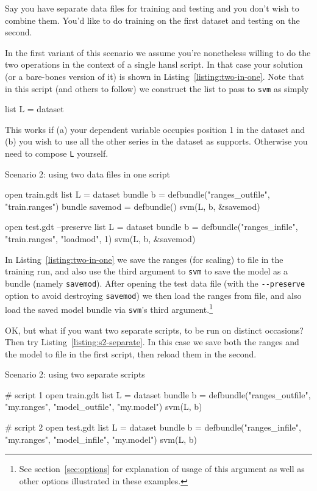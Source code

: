 \documentclass{article}
\begin{document}
Say you have separate data files for training and testing and you
don't wish to combine them. You'd like to do training on the first
dataset and testing on the second.

In the first variant of this scenario we assume you're nonetheless
willing to do the two operations in the context of a single hansl
script. In that case your solution (or a bare-bones version of it) is
shown in Listing~\ref{listing:two-in-one}. Note that in this script
(and others to follow) we construct the list to pass to \texttt{svm}
as simply
\begin{code}
list L = dataset
\end{code}
This works if (a) your dependent variable occupies position 1 in the
dataset and (b) you wish to use all the other series in the dataset as
supports. Otherwise you need to compose \texttt{L} yourself.

\begin{script}[htbp]
  \caption{Scenario 2: using two data files in one script}
  \label{listing:two-in-one}
\begin{scode}
open train.gdt
list L = dataset
bundle b = defbundle("ranges_outfile", "train.ranges")
bundle savemod = defbundle()
svm(L, b, &savemod)

open test.gdt --preserve
list L = dataset
bundle b = defbundle("ranges_infile", "train.ranges", "loadmod", 1)
svm(L, b, &savemod)
\end{scode}
\end{script}

In Listing~\ref{listing:two-in-one} we save the ranges (for scaling)
to file in the training run, and also use the third argument to
\texttt{svm} to save the model as a bundle (namely
\texttt{savemod}). After opening the test data file (with the
\verb|--preserve| option to avoid destroying \texttt{savemod}) we then
load the ranges from file, and also load the saved model bundle via
\texttt{svm}'s third argument.\footnote{See section~\ref{sec:options}
  for explanation of usage of this argument as well as other options
  illustrated in these examples.}

OK, but what if you want two separate scripts, to be run on distinct
occasions? Then try Listing~\ref{listing:s2-separate}. In this case we
save both the ranges and the model to file in the first script, then
reload them in the second.

\begin{script}[htbp]
  \caption{Scenario 2: using two separate scripts}
  \label{listing:s2-separate}
\begin{scode}
# script 1
open train.gdt
list L = dataset
bundle b = defbundle("ranges_outfile", "my.ranges", "model_outfile", "my.model")
svm(L, b)

# script 2
open test.gdt
list L = dataset
bundle b = defbundle("ranges_infile", "my.ranges", "model_infile", "my.model")
svm(L, b)
\end{scode}
\end{script}
\end{document}
